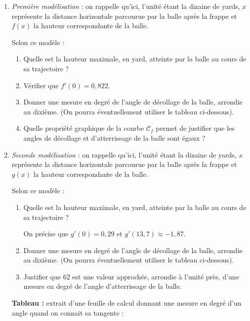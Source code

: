 \documentclass[11pt,a4paper,french]{article}
\begin{document}
\begin{enumerate}
\item \emph{Première modélisation} : on rappelle qu'ici, l'unité étant la dizaine de yards, $x$ représente la distance horizontale parcourue par la balle après la frappe et $f(x)$ la hauteur correspondante de la balle.

Selon ce modèle :
	\begin{enumerate}
		\item Quelle est la hauteur maximale, en yard, atteinte par la balle au cours de sa trajectoire ?
		\item Vérifier que $f'(0) = 0,822$.
		\item Donner une mesure en degré de l'angle de décollage de la balle, arrondie au dixième. (On pourra éventuellement utiliser le tableau ci-dessous).
		\item Quelle propriété graphique de la courbe $\mathcal{C}_f$ permet de justifier que les angles de décollage et d'atterrissage de la balle sont égaux ?
	\end{enumerate}
\item \emph{Seconde modélisation } : on rappelle qu'ici, l'unité étant la dizaine de yards, $x$ représente la distance horizontale parcourue par la balle après la frappe et $g(x)$ la hauteur correspondante de la balle.

Selon ce modèle :

	\begin{enumerate}
		\item Quelle est la hauteur maximale, en yard, atteinte par la balle au cours de sa trajectoire ?

On précise que $g'(0) = 0,29$ et $g'(13,7) \approx -1,87$.
		\item Donner une mesure en degré de l'angle de décollage de la balle, arrondie au dixième. (On pourra éventuellement utiliser le tableau ci-dessous).
		\item Justifier que $62$ est une valeur approchée, arrondie à l'unité près, d'une mesure en degré de l'angle d'atterrissage de la balle.
	\end{enumerate}
\medskip

\textbf{Tableau :} extrait d'une feuille de calcul donnant une mesure en degré d'un angle quand on connait sa tangente :


\end{enumerate}
\end{document}
